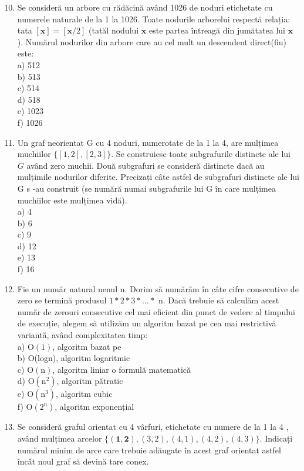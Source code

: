 \begin{enumerate}
  \setcounter{enumi}{9}
  \item Se consideră un arbore cu rădăcină având 1026 de noduri etichetate cu numerele naturale de la 1 la 1026. Toate nodurile arborelui respectă relația: tata $[\mathbf{x}]=[\mathbf{x} / 2]$ (tatăl nodului $\mathbf{x}$ este partea întreagă din jumătatea lui $\mathbf{x}$ ). Numărul nodurilor din arbore care au cel mult un descendent direct(fiu) este:\\
a) 512\\
b) 513\\
c) 514\\
d) 518\\
e) 1023\\
f) 1026
  \item Un graf neorientat G cu 4 noduri, numerotate de la 1 la 4, are mulțimea muchiilor $\{[1,2],[2,3]\}$. Se construiesc toate subgrafurile distincte ale lui $G$ având zero muchii. Două subgrafuri se consideră distincte dacă au mulțimile nodurilor diferite. Precizați câte astfel de subgrafuri distincte ale lui G s -au construit (se numără numai subgrafurile lui G în care mulțimea muchiilor este mulțimea vidă).\\
a) 4\\
b) 6\\
c) 9\\
d) 12\\
e) 13\\
f) 16
  \item Fie un număr natural nenul n. Dorim să numărăm în câte cifre consecutive de zero se termină produsul $1 * 2 * 3 * \ldots *$ n. Dacă trebuie să calculăm acest număr de zerouri consecutive cel mai eficient din punct de vedere al timpului de execuție, alegem să utilizăm un algoritm bazat pe cea mai restrictivă variantă, având complexitatea timp:\\
a) $\mathrm{O}(1)$, algoritm bazat pe\\
b) O(logn), algoritm logaritmic\\
c) $\mathrm{O}(\mathrm{n})$, algoritm liniar o formulă matematică\\
d) $\mathrm{O}\left(\mathrm{n}^{2}\right)$, algoritm pătratic\\
e) $\mathrm{O}\left(\mathrm{n}^{3}\right)$, algoritm cubic\\
f) $\mathrm{O}\left(2^{\mathrm{n}}\right)$, algoritm exponențial
  \item Se consideră graful orientat cu 4 vârfuri, etichetate cu numere de la 1 la 4 , având mulțimea arcelor $\{(\mathbf{1}, \mathbf{2}),(3,2),(4,1),(4,2),(4,3)\}$. Indicați numărul minim de arce care trebuie adăugate în acest graf orientat astfel încât noul graf să devină tare conex.\\

\end{enumerate}
